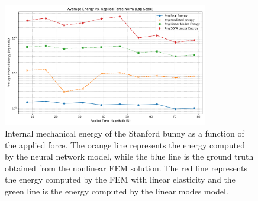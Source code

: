 \begin{figure}[H]
    \centering
    \includegraphics[width=0.8\textwidth]{Images/bunny_static_energy.png}
    \caption{Internal mechanical energy of the Stanford bunny as a function of the applied force. The orange line represents the energy computed by the neural network model, while the blue line is the ground truth obtained from the nonlinear FEM solution. The red line represents the energy computed by the FEM with linear elasticity and the green line is the energy computed by the linear modes model.}
    \label{fig:static_energy_bunny}
    \end{figure}

    



